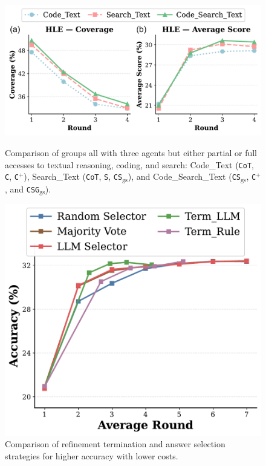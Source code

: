 \begin{figure}[ht]
    \centering
    \begin{minipage}[ht]{0.59\textwidth}
        \centering
        \includegraphics[width=0.98\linewidth]{Figures/search_code_text.pdf}
        \caption{Comparison of groups all with three agents but either partial or full accesses to textual reasoning, coding, and search: Code\_Text (\texttt{CoT}, \texttt{C}, \texttt{C$^+$}), Search\_Text (\texttt{CoT}, \texttt{S}, \texttt{CS$_{\text{gs}}$}), and Code\_Search\_Text (\texttt{CS$_{\text{gs}}$}, \texttt{C$^+$}, and \texttt{CSG$_{\text{gs}}$}).}
        \label{fig:search_code_text}
    \end{minipage}%
    \hfill
    \begin{minipage}[ht]{0.39\textwidth}
        \centering
        \includegraphics[width=0.98\linewidth]{Figures/selector_comparison.pdf}
        \caption{Comparison of refinement termination and answer selection strategies for higher accuracy with lower costs.}
        \label{fig:selector_comparison}
    \end{minipage}
\end{figure}

